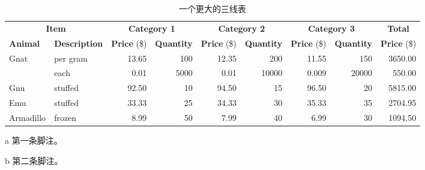 \begin{table}[!htbp]
  \centering
  \begin{threeparttable}[b]
    \caption{一个更大的三线表}
    \label{tab:bigtable}
    \begin{tabular}{@{}llrrrrrrr@{}} \toprule
      \multicolumn{2}{c}{\textbf{Item}} & \multicolumn{2}{c}{\textbf{Category 1}} & \multicolumn{2}{c}{\textbf{Category 2}} & \multicolumn{2}{c}{\textbf{Category 3}} & \multicolumn{1}{c}{\textbf{Total}}                                                                                     \\ \cmidrule(r){1-2} \cmidrule(lr){3-4} \cmidrule(lr){5-6} \cmidrule(lr){7-8} \cmidrule(l){9-9}
      \textbf{Animal}                   & \textbf{Description}                    & \textbf{Price} (\$)                     & \textbf{Quantity}                       & \textbf{Price} (\$)                & \textbf{Quantity} & \textbf{Price} (\$) & \textbf{Quantity} & \textbf{Price} (\$) \\ \midrule
      Gnat                              & per gram\tnote{a}                       & 13.65                                   & 100                                     & 12.35                              & 200               & 11.55               & 150               & 3650.00             \\
                                        & each                                    & 0.01                                    & 5000                                    & 0.01                               & 10000             & 0.009               & 20000             & 550.00              \\
      Gnu                               & stuffed                                 & 92.50                                   & 10                                      & 94.50                              & 15                & 96.50               & 20                & 5815.00             \\
      Emu                               & stuffed                                 & 33.33                                   & 25                                      & 34.33                              & 30                & 35.33               & 35                & 2704.95             \\
      Armadillo                         & frozen                                  & 8.99                                    & 50                                      & 7.99                               & 40                & 6.99                & 30\tnote{b}       & 1094.50             \\ \bottomrule
    \end{tabular}
    \begin{tablenotes}
      \item [a] 第一条脚注。
      \item [b] 第二条脚注。
    \end{tablenotes}
  \end{threeparttable}
\end{table}

